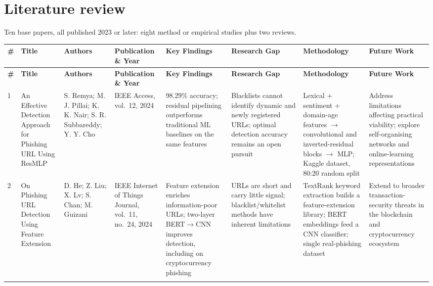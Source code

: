 \documentclass[10pt,a4paper]{article}
\begin{document}
\clearpage
\section{Literature review}

Ten base papers, all published 2023 or later: eight method or empirical studies plus two reviews.

\vspace{2mm}
{\scriptsize
\setlength{\tabcolsep}{3pt}
\renewcommand{\arraystretch}{1.15}
\begin{longtable}{@{}L{4mm} L{34mm} L{26mm} L{22mm} L{40mm} L{34mm} L{40mm} L{34mm}@{}}
\toprule
\textbf{\#} & \textbf{Title} & \textbf{Authors} & \textbf{Publication \& Year} &
\textbf{Key Findings} & \textbf{Research Gap} & \textbf{Methodology} & \textbf{Future Work}\\
\midrule
\endfirsthead
\toprule
\textbf{\#} & \textbf{Title} & \textbf{Authors} & \textbf{Publication \& Year} &
\textbf{Key Findings} & \textbf{Research Gap} & \textbf{Methodology} & \textbf{Future Work}\\
\midrule
\endhead
\bottomrule
\endfoot

1 & An Effective Detection Approach for Phishing URL Using ResMLP &
S. Remya; M. J. Pillai; K. K. Nair; S. R. Subbareddy; Y. Y. Cho &
IEEE Access, vol.~12, 2024 &
98.29\% accuracy; residual pipelining outperforms traditional ML baselines on the same features &
Blacklists cannot identify dynamic and newly registered URLs; optimal detection accuracy remains
an open pursuit &
Lexical + sentiment + domain-age features $\rightarrow$ convolutional and inverted-residual
blocks $\rightarrow$ MLP; Kaggle dataset, 80:20 random split &
Address limitations affecting practical viability; explore self-organising networks and
online-learning representations \\
\addlinespace

2 & On Phishing URL Detection Using Feature Extension &
D. He; Z. Liu; X. Lv; S. Chan; M. Guizani &
IEEE Internet of Things Journal, vol.~11, no.~24, 2024 &
Feature extension enriches information-poor URLs; two-layer BERT$\rightarrow$CNN improves
detection, including on cryptocurrency phishing &
URLs are short and carry little signal; blacklist/whitelist methods have inherent limitations &
TextRank keyword extraction builds a feature-extension library; BERT embeddings feed a CNN
classifier; single real-phishing dataset &
Extend to broader transaction-security threats in the blockchain and cryptocurrency ecosystem \\
\addlinespace


\end{longtable}}
\end{document}
